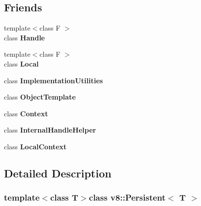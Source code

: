 \subsection*{Friends}
\begin{DoxyCompactItemize}
\item 
\hypertarget{classv8_1_1_persistent_a67ca1a2d91273eaf85fb3d23ba8ce984}{}{\footnotesize template$<$class F $>$ }\\class {\bfseries Handle}\label{classv8_1_1_persistent_a67ca1a2d91273eaf85fb3d23ba8ce984}

\item 
\hypertarget{classv8_1_1_persistent_afb872edb4aac7ba55f0da004113aa2b0}{}{\footnotesize template$<$class F $>$ }\\class {\bfseries Local}\label{classv8_1_1_persistent_afb872edb4aac7ba55f0da004113aa2b0}

\item 
\hypertarget{classv8_1_1_persistent_ac7b520085953e146d849e05253267f72}{}class {\bfseries Implementation\+Utilities}\label{classv8_1_1_persistent_ac7b520085953e146d849e05253267f72}

\item 
\hypertarget{classv8_1_1_persistent_a4d28646409234f556983be8a96c06424}{}class {\bfseries Object\+Template}\label{classv8_1_1_persistent_a4d28646409234f556983be8a96c06424}

\item 
\hypertarget{classv8_1_1_persistent_ac26c806e60ca4a0547680edb68f6e39b}{}class {\bfseries Context}\label{classv8_1_1_persistent_ac26c806e60ca4a0547680edb68f6e39b}

\item 
\hypertarget{classv8_1_1_persistent_a4d886c8e6d4c47ae9d59f6d878048580}{}class {\bfseries Internal\+Handle\+Helper}\label{classv8_1_1_persistent_a4d886c8e6d4c47ae9d59f6d878048580}

\item 
\hypertarget{classv8_1_1_persistent_ae34f528093f2fad464ce37f6e64c763d}{}class {\bfseries Local\+Context}\label{classv8_1_1_persistent_ae34f528093f2fad464ce37f6e64c763d}

\end{DoxyCompactItemize}


\subsection{Detailed Description}
\subsubsection*{template$<$class T$>$class v8\+::\+Persistent$<$ T $>$}

